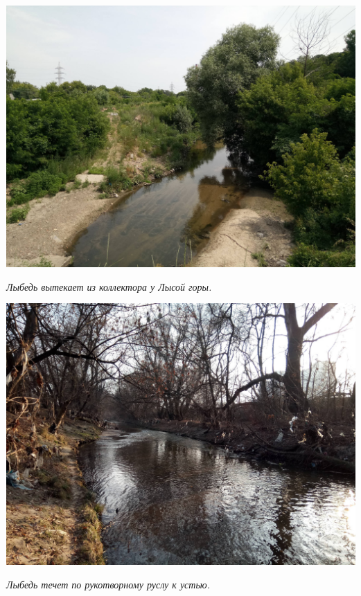 






\begin{center}
\includegraphics[width=0.95\linewidth]{rpix/IMG_20190616_135257.jpg}

\textit{Лыбедь вытекает из коллектора у Лысой горы.}
\end{center}


\begin{center}
\includegraphics[width=0.92\linewidth]{rpix/IMG_20191126_132719.jpg}

\textit{Лыбедь течет по рукотворному руслу к устью.}
\end{center}


